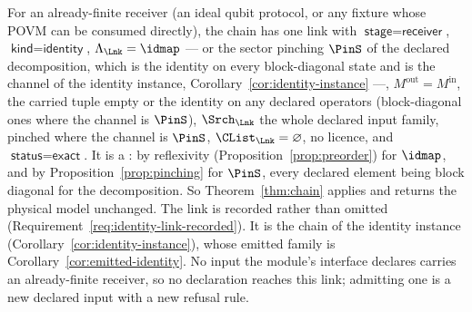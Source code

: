 
\begin{example}\label{ex:identity}
For an already-finite receiver (an ideal qubit protocol, or any fixture whose
POVM can be consumed directly), the chain has one link with
$\textsf{stage}=\textsf{receiver}$, $\textsf{kind}=\textsf{identity}$,
$\Lambda_{\Lnk}=\idmap$ --- or the sector pinching $\PinS$ of the declared
decomposition, which is the identity on every block-diagonal state and is the
channel of the identity instance, Corollary~\ref{cor:identity-instance} ---,
$M^{\mathrm{out}}=M^{\mathrm{in}}$, the carried tuple
empty or the identity on any declared operators (block-diagonal ones where
the channel is $\PinS$),
$\Srch_{\Lnk}$ the whole declared input family, pinched where the channel is
$\PinS$,
$\CList_{\Lnk}=\varnothing$, no licence, and
$\textsf{status}=\textsf{exact}$. It is a : by
reflexivity (Proposition~\ref{prop:preorder}) for $\idmap$, and by
Proposition~\ref{prop:pinching} for $\PinS$, every declared element being
block diagonal for the decomposition. So Theorem~\ref{thm:chain} applies and
returns the physical model unchanged. The link is recorded rather than
omitted (Requirement~\ref{req:identity-link-recorded}). It is the chain of
the identity instance (Corollary~\ref{cor:identity-instance}), whose emitted
family is Corollary~\ref{cor:emitted-identity}. No input the module's
interface declares carries an already-finite receiver, so no declaration
reaches this link; admitting one is a new declared input with a new refusal
rule.
\end{example}
